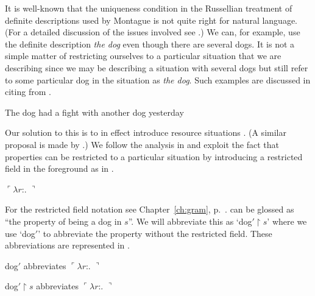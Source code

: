 It is well-known that the uniqueness condition in
the Russellian treatment of definite descriptions used by Montague is not quite right
for natural language.  (For a detailed discussion of the issues
involved see \citealp{Elbourne2012}.)  We can, for example, use the
definite description \textit{the dog} even though there are several
dogs.  It is not a simple matter of restricting ourselves to a
particular situation that we are describing since we may be describing
a situation with several dogs but still refer to some particular dog
in the situation as \textit{the dog}.  Such examples are discussed in
\cite{Cooper1996a} citing \nexteg{} from \cite{McCawley1979}.
\begin{ex} 
The dog had a fight with another dog yesterday 
\end{ex} 
Our solution to this is to in effect introduce resource situations
\citep{BarwisePerry1983,Cooper1996a}.  (A similar proposal is made by
\citealp{Elbourne2012}.) We follow the analysis in \cite{Cooper2013b}
and exploit the fact that properties can be restricted to a particular
situation by introducing a restricted field in the foreground as in \nexteg{}.
\begin{ex}
$\ulcorner\lambda
  r$:. $\urcorner$ 
\end{ex} 
For the restricted field notation  see
Chapter~\ref{ch:gram}, p.~\pageref{pg:restfld}.  \preveg{} can be glossed as ``the property of being a dog in $s$''.
We will abbreviate this as `dog$'$$\restriction$$s$' where we use
`dog$'$' to abbreviate the property without the restricted field.  These
abbreviations are represented in \nexteg{}.
\begin{ex} 
\begin{subex} 
 
\item dog$'$ abbreviates 
$\ulcorner\lambda
  r$:. $\urcorner$ 
 
\item dog$'$$\restriction$$s$ abbreviates 
$\ulcorner\lambda
  r$:. $\urcorner$ 

\end{subex} 
\label{ex:dogprime}    
\end{ex} 

